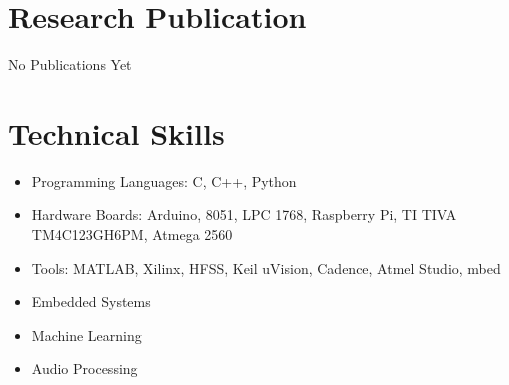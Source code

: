 \documentclass[12pt,a4paper,sans]{moderncv} %
\begin{document}

\section{Research Publication}

No Publications Yet


\section{Technical Skills}

\begin{itemize}
	\item Programming Languages: C, C++, Python
	\item Hardware Boards: Arduino, 8051, LPC 1768, Raspberry Pi, TI TIVA TM4C123GH6PM, Atmega 2560
	\item Tools: MATLAB, Xilinx, HFSS, Keil uVision, Cadence, Atmel Studio, mbed 
	\item Embedded Systems
	\item Machine Learning
	\item Audio Processing
	
\end{itemize}
\end{document}
